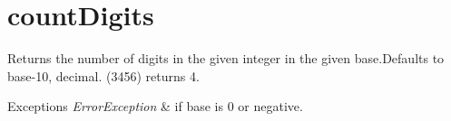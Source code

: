 \hypertarget{countDigits-example}{}\section{count\+Digits}
Returns the number of digits in the given integer in the given base.\+Defaults to base-\/10, decimal. (3456) returns 4. 
\begin{DoxyExceptions}{Exceptions}
{\em Error\+Exception} & if base is 0 or negative.\\
\hline
\end{DoxyExceptions}

\begin{DoxyCodeInclude}
\end{DoxyCodeInclude}
 